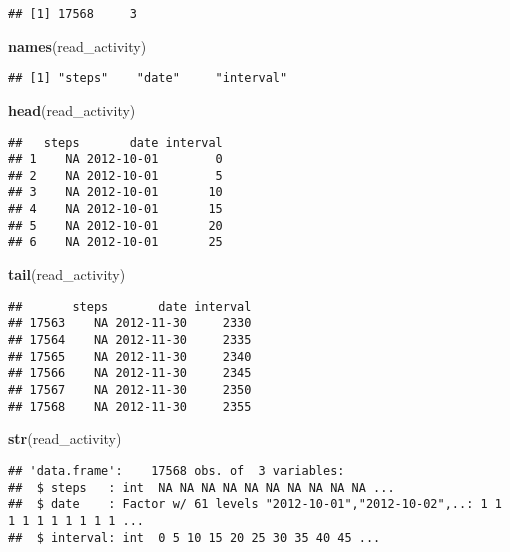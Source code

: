 \documentclass[]{article}
\newenvironment{Shaded}{\begin{snugshade}}{\end{snugshade}}
\newcommand{\KeywordTok}[1]{\textcolor[rgb]{0.13,0.29,0.53}{\textbf{#1}}}
\newcommand{\NormalTok}[1]{#1}
\begin{document}
\begin{verbatim}
## [1] 17568     3
\end{verbatim}

\begin{Shaded}
\begin{Highlighting}[]
\KeywordTok{names}\NormalTok{(read_activity)}
\end{Highlighting}
\end{Shaded}

\begin{verbatim}
## [1] "steps"    "date"     "interval"
\end{verbatim}

\begin{Shaded}
\begin{Highlighting}[]
\KeywordTok{head}\NormalTok{(read_activity)}
\end{Highlighting}
\end{Shaded}

\begin{verbatim}
##   steps       date interval
## 1    NA 2012-10-01        0
## 2    NA 2012-10-01        5
## 3    NA 2012-10-01       10
## 4    NA 2012-10-01       15
## 5    NA 2012-10-01       20
## 6    NA 2012-10-01       25
\end{verbatim}

\begin{Shaded}
\begin{Highlighting}[]
\KeywordTok{tail}\NormalTok{(read_activity)}
\end{Highlighting}
\end{Shaded}

\begin{verbatim}
##       steps       date interval
## 17563    NA 2012-11-30     2330
## 17564    NA 2012-11-30     2335
## 17565    NA 2012-11-30     2340
## 17566    NA 2012-11-30     2345
## 17567    NA 2012-11-30     2350
## 17568    NA 2012-11-30     2355
\end{verbatim}

\begin{Shaded}
\begin{Highlighting}[]
\KeywordTok{str}\NormalTok{(read_activity)}
\end{Highlighting}
\end{Shaded}

\begin{verbatim}
## 'data.frame':    17568 obs. of  3 variables:
##  $ steps   : int  NA NA NA NA NA NA NA NA NA NA ...
##  $ date    : Factor w/ 61 levels "2012-10-01","2012-10-02",..: 1 1 1 1 1 1 1 1 1 1 ...
##  $ interval: int  0 5 10 15 20 25 30 35 40 45 ...
\end{verbatim}
\end{document}
